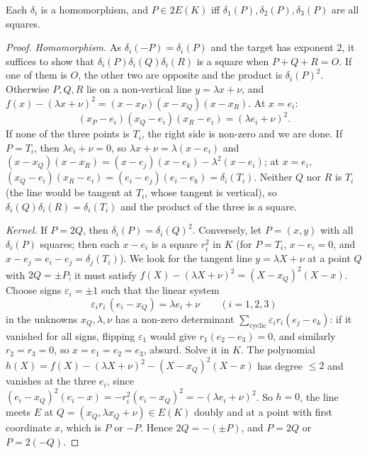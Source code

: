 \begin{lemma}\label{lem:deltahom}
Each $\delta_i$ is a homomorphism, and $P\in2E(K)$ iff $\delta_1(P),\delta_2(P),\delta_3(P)$ are all squares.
\end{lemma}
\begin{proof}
\emph{Homomorphism.} As $\delta_i(-P)=\delta_i(P)$ and the target has exponent $2$, it suffices to show that $\delta_i(P)\delta_i(Q)\delta_i(R)$ is a square
when $P+Q+R=O$. If one of them is $O$, the other two are opposite and the product is $\delta_i(P)^2$. Otherwise $P,Q,R$ lie on a non-vertical line
$y=\lambda x+\nu$, and $f(x)-(\lambda x+\nu)^2=(x-x_P)(x-x_Q)(x-x_R)$. At $x=e_i$:
\[
(x_P-e_i)(x_Q-e_i)(x_R-e_i)=(\lambda e_i+\nu)^2.
\]
If none of the three points is $T_i$, the right side is non-zero and we are done. If $P=T_i$, then $\lambda e_i+\nu=0$, so $\lambda x+\nu=\lambda(x-e_i)$ and
$(x-x_Q)(x-x_R)=(x-e_j)(x-e_k)-\lambda^2(x-e_i)$; at $x=e_i$, $(x_Q-e_i)(x_R-e_i)=(e_i-e_j)(e_i-e_k)=\delta_i(T_i)$. Neither $Q$ nor $R$ is $T_i$ (the line would
be tangent at $T_i$, whose tangent is vertical), so $\delta_i(Q)\delta_i(R)=\delta_i(T_i)$ and the product of the three is a square.

\emph{Kernel.} If $P=2Q$, then $\delta_i(P)=\delta_i(Q)^2$. Conversely, let $P=(x,y)$ with all $\delta_i(P)$ squares; then each $x-e_i$ is a square $r_i^2$ in $K$
(for $P=T_i$, $x-e_i=0$, and $x-e_j=e_i-e_j=\delta_j(T_i)$). We look for the tangent line $y=\lambda X+\nu$ at a point $Q$ with $2Q=\pm P$; it must satisfy
$f(X)-(\lambda X+\nu)^2=(X-x_Q)^2(X-x)$. Choose signs $\varepsilon_i=\pm1$ such that the linear system
\[
\varepsilon_ir_i\,(e_i-x_Q)=\lambda e_i+\nu\qquad(i=1,2,3)
\]
in the unknowns $x_Q,\lambda,\nu$ has a non-zero determinant $\sum_{\text{cyclic}}\varepsilon_ir_i(e_j-e_k)$: if it vanished for all signs, flipping
$\varepsilon_1$ would give $r_1(e_2-e_3)=0$, and similarly $r_2=r_3=0$, so $x=e_1=e_2=e_3$, absurd. Solve it in $K$. The polynomial
$h(X)=f(X)-(\lambda X+\nu)^2-(X-x_Q)^2(X-x)$ has degree $\le2$ and vanishes at the three $e_i$, since $(e_i-x_Q)^2(e_i-x)=-r_i^2(e_i-x_Q)^2=-(\lambda e_i+\nu)^2$.
So $h=0$, the line meets $E$ at $Q=(x_Q,\lambda x_Q+\nu)\in E(K)$ doubly and at a point with first coordinate $x$, which is $P$ or $-P$. Hence $2Q=-(\pm P)$, and
$P=2Q$ or $P=2(-Q)$.
\end{proof}

